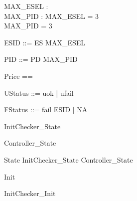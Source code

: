 \documentclass{article}
\begin{document}

\begin{axdef}
	MAX\_ESEL : \nat \\
 MAX\_PID : \nat 
\where
 MAX\_ESEL = 3 \\
 MAX\_PID = 3
\end{axdef}

\begin{zed}
	ESID ::= ES  \upto MAX\_ESEL \rdata
\end{zed}

\begin{zed}
	PID ::= PD  \upto MAX\_PID \rdata
\end{zed}

\begin{zed}
	Price == \nat
\end{zed}

\begin{zed}
	UStatus ::= uok | ufail
\end{zed}

\begin{zed}
	FStatus ::= fail \ldata ESID \rdata | NA
\end{zed}

\begin{zed}
	InitChecker\_State 
\end{zed}

\begin{zed}
	Controller\_State 
\end{zed}

\begin{zed}
	State  InitChecker\_State \land Controller\_State
\end{zed}

\begin{zed}
	Init 
\end{zed}

\begin{zed}
	InitChecker\_Init 
\end{zed}
\end{document}
